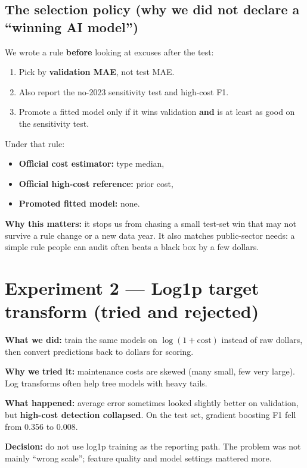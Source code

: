 \documentclass[11pt,a4paper]{article}
\begin{document}
\subsection{The selection policy (why we did not declare a ``winning AI model'')}

We wrote a rule \textbf{before} looking at excuses after the test:
\begin{enumerate}
  \item Pick by \textbf{validation MAE}, not test MAE.
  \item Also report the no-2023 sensitivity test and high-cost F1.
  \item Promote a fitted model only if it wins validation \textbf{and} is at least as good on the sensitivity test.
\end{enumerate}

Under that rule:
\begin{itemize}
  \item \textbf{Official cost estimator:} type median,
  \item \textbf{Official high-cost reference:} prior cost,
  \item \textbf{Promoted fitted model:} none.
\end{itemize}

\textbf{Why this matters:} it stops us from chasing a small test-set win that may not survive a rule change or a new data year. It also matches public-sector needs: a simple rule people can audit often beats a black box by a few dollars.

\section{Experiment 2 --- Log1p target transform (tried and rejected)}

\textbf{What we did:} train the same models on $\log(1 + \text{cost})$ instead of raw dollars, then convert predictions back to dollars for scoring.

\textbf{Why we tried it:} maintenance costs are skewed (many small, few very large). Log transforms often help tree models with heavy tails.

\textbf{What happened:} average error sometimes looked slightly better on validation, but \textbf{high-cost detection collapsed}. On the test set, gradient boosting F1 fell from 0.356 to 0.008.

\textbf{Decision:} do not use log1p training as the reporting path. The problem was not mainly ``wrong scale''; feature quality and model settings mattered more.
\end{document}

